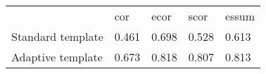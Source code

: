 \documentclass[
   UAM                                          %
 , 12pt                                         %
 , bibtex                                       %
 , layout
]{common/mytemplate}
\begin{document}
\begin{table}[bh]
\begin{tabular}[c]{l l l l l}\hline
\rowcolor{tabBlue} & cor   & ecor  & scor  & essum \\
Standard template & 0.461 & 0.698 & 0.528 & 0.613 \\
Adaptive template & 0.673 & 0.818 & 0.807 & 0.813
\end{tabular}
\end{table}



% 

% 
\newpage

% 
% 
\end{document}
